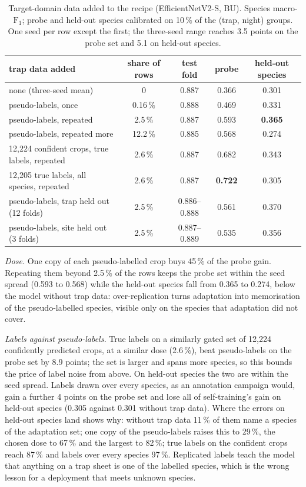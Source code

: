 \begin{table}[htb]
    \centering
    \caption{Target-domain data added to the recipe (EfficientNetV2-S, BU). Species macro-$\text{F}_1$; probe and held-out species calibrated on 10\,\% of the (trap, night) groups. One seed per row except the first; the three-seed range reaches 3.5 points on the probe set and 5.1 on held-out species.}
    \label{tab:selftraining}
    \begin{tabular}{lcccc}
        \toprule
        trap data added & share of rows & test fold & probe & held-out species \\
        \midrule
        none (three-seed mean) & 0 & 0.887 & 0.366 & 0.301 \\
        pseudo-labels, once & 0.16\,\% & 0.888 & 0.469 & 0.331 \\
        pseudo-labels, repeated & 2.5\,\% & 0.887 & 0.593 & \textbf{0.365} \\
        pseudo-labels, repeated more & 12.2\,\% & 0.885 & 0.568 & 0.274 \\
        \midrule
        12,224 confident crops, true labels, repeated & 2.6\,\% & 0.887 & 0.682 & 0.343 \\
        12,205 true labels, all species, repeated & 2.6\,\% & 0.887 & \textbf{0.722} & 0.305 \\
        \midrule
        pseudo-labels, trap held out (12 folds) & 2.5\,\% & 0.886--0.888 & 0.561 & 0.370 \\
        pseudo-labels, site held out (3 folds) & 2.5\,\% & 0.887--0.889 & 0.535 & 0.356 \\
        \bottomrule
    \end{tabular}
\end{table}

\emph{Dose.} One copy of each pseudo-labelled crop buys 45\,\% of the probe gain.
Repeating them beyond 2.5\,\% of the rows keeps the probe set within the seed spread (0.593 to 0.568) while the held-out species fall from 0.365 to 0.274, below the model without trap data: over-replication turns adaptation into memorisation of the pseudo-labelled species, visible only on the species that adaptation did not cover.

\emph{Labels against pseudo-labels.} True labels on a similarly gated set of 12,224 confidently predicted crops, at a similar dose (2.6\,\%), beat pseudo-labels on the probe set by 8.9 points; the set is larger and spans more species, so this bounds the price of label noise from above. On held-out species the two are within the seed spread.
Labels drawn over every species, as an annotation campaign would, gain a further 4 points on the probe set and lose all of self-training's gain on held-out species (0.305 against 0.301 without trap data).
Where the errors on held-out species land shows why: without trap data 11\,\% of them name a species of the adaptation set; one copy of the pseudo-labels raises this to 29\,\%, the chosen dose to 67\,\% and the largest to 82\,\%; true labels on the confident crops reach 87\,\% and labels over every species 97\,\%.
Replicated labels teach the model that anything on a trap sheet is one of the labelled species, which is the wrong lesson for a deployment that meets unknown species.

